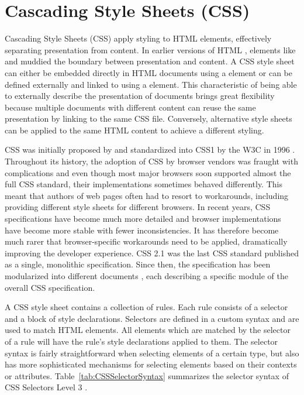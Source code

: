 \section{Cascading Style Sheets (CSS)}
\label{sec:CSS}

Cascading Style Sheets (CSS) apply styling to HTML elements,
effectively separating presentation from content. In earlier versions
of HTML \parencite{HTML32}, elements like  and
 muddied the boundary between presentation and content.
%
A CSS style sheet can either be embedded directly in HTML documents
using a  element or can be defined externally and
linked to using a  element. This characteristic of
being able to externally describe the presentation of documents brings
great flexibility because multiple documents with different content
can reuse the same presentation by linking to the same CSS file.
Conversely, alternative style sheets can be applied to the same HTML
content to achieve a different styling.


CSS was initially proposed by \textcite{CSSProposal} and standardized
into CSS1 by the W3C in 1996 \parencite{CSS1}. Throughout its history,
the adoption of CSS by browser vendors was fraught with complications
and even though most major browsers soon supported almost the full CSS
standard, their implementations sometimes behaved differently. This
meant that authors of web pages often had to resort to workarounds,
including providing different style sheets for different browsers. In
recent years, CSS specifications have become much more detailed
\parencite{CSS21} and browser implementations have become more stable
with fewer inconsistencies. It has therefore become much rarer that
browser-specific workarounds need to be applied, dramatically
improving the developer experience. CSS 2.1 \parencite{CSS21} was the
last CSS standard published as a single, monolithic
specification. Since then, the specification has been modularized into
different documents \parencite{CSSSnapshot2020}, each describing a
specific module of the overall CSS specification.
 

A CSS style sheet contains a collection of rules. Each rule consists
of a selector and a block of style declarations. Selectors are defined
in a custom syntax and are used to match HTML elements. All elements
which are matched by the selector of a rule will have the rule's style
declarations applied to them. The selector syntax is fairly
straightforward when selecting elements of a certain type, but also
has more sophisticated mechanisms for selecting elements based on
their contexts or attributes. Table~\ref{tab:CSSSelectorSyntax}
summarizes the selector syntax of CSS Selectors Level 3
\parencite{CSSSelectors3}.




